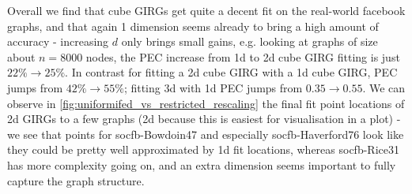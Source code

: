 

Overall we find that cube GIRGs get quite a decent fit on the real-world facebook graphs, and that again 1 dimension seems already to bring a high amount of accuracy - increasing $d$ only brings small gains, e.g. looking at graphs of size about $n=8000$ nodes, the PEC increase from 1d to 2d cube GIRG fitting is just $22\% \to 25\%$. In contrast for fitting a 2d cube GIRG with a 1d cube GIRG, PEC jumps from $42\% \to 55\%$; fitting 3d with 1d PEC jumps from $0.35 \to 0.55$. We can observe in \cref{fig:uniformifed_vs_restricted_rescaling} the final fit point locations of 2d GIRGs to a few graphs (2d because this is easiest for visualisation in a plot) - we see that points for socfb-Bowdoin47 and especially socfb-Haverford76 look like they could be pretty well approximated by 1d fit locations, whereas socfb-Rice31 has more complexity going on, and an extra dimension seems important to fully capture the graph structure.



